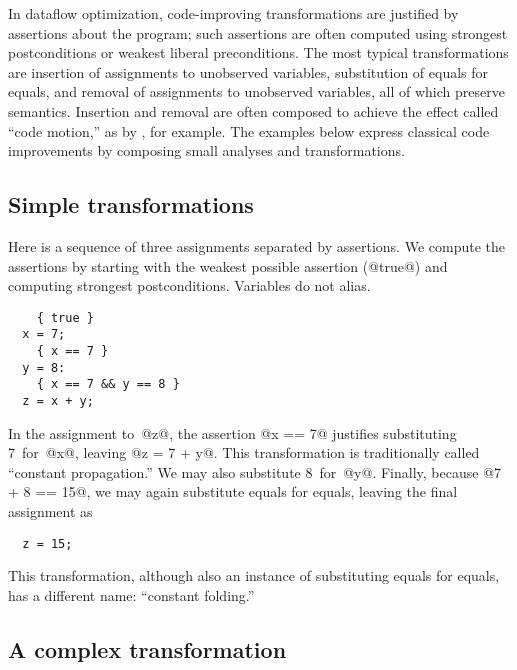 \documentclass[blockstyle,preprint,nocopyrightspace]{sigplanconf}
\newcommand{\authornote}[1]{{\em #1}}
\def\authornote#1{\unskip\relax}
\newcommand{\simon}[1]{\authornote{SLPJ: #1}}
\newcommand\seclabel[1]{\label{sec:#1}}
\begin{document}
\seclabel{example:transforms}
\seclabel{example:xforms}

In dataflow optimization, code-improving transformations are justified
by assertions about the program;
such assertions are often computed using
strongest postconditions or weakest liberal preconditions.
The most typical transformations are
insertion of assignments to unobserved variables,
substitution of equals for equals, 
and
removal of assignments to unobserved variables,
all of which preserve semantics.
Insertion and removal are often composed to achieve the effect called
``code motion,'' as by \citet{knoop:lazy-code-motion}, for example.
The examples below express classical code
improvements by composing small analyses and transformations.



\subsection{Simple transformations}

\seclabel{constant-propagation}

Here is a sequence of three assignments separated by assertions.
We compute the assertions by starting with the weakest possible
assertion (@true@) and computing strongest postconditions.
{Variables do not alias.}
\begin{verbatim}
    { true }
  x = 7;
    { x == 7 }
  y = 8: 
    { x == 7 && y == 8 }
  z = x + y;
\end{verbatim}
In the assignment to~@z@, the assertion @x == 7@ justifies
substituting 7~for~@x@, leaving @z = 7 + y@.  
This transformation is traditionally called ``constant propagation.''
We may also substitute 8~for~@y@.
Finally, because @7 + 8 == 15@, we may again substitute equals for
equals, leaving the final assignment as
\begin{verbatim}
  z = 15;
\end{verbatim}
This transformation, although also an instance of substituting equals
for equals, has a different name: ``constant folding.''

\subsection{A complex transformation}
\simon{It's a pity that this transformation occupies nearly the entire second page, 
and then plays no subsequent role in the paper whatsoever.
One possibility: move it to ``the next 700'' section, as a substantiating example
to the claims made there.
But then we'd need another example here... well the sink/reload example of
Section 4 might be perfect.}
\end{document}
